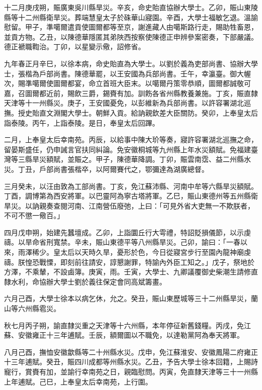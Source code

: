 \begin{pinyinscope}
十二月庚戌朔，賑廣東吳川縣旱災。辛亥，命史貽直協辦大學士。乙卯，賑山東陵縣等十二州縣衛旱災。葬端慧皇太子於硃華山寢園。辛酉，大學士福敏乞退。溫諭慰留。甲子，準噶爾遣貢使圖爾都等至京，謝進藏人由噶斯路行走，賜助牲畜恩，並貢方物。乙丑，以陳德華隱匿其弟陜西按察使陳德正申辨參案密奏，下部嚴議。德正褫職鞫治。丁卯，以星變示儆，詔修省。

九年春正月辛巳，以徐本病，命史貽直為大學士。以劉於義為吏部尚書、協辦大學士，張楷為戶部尚書。陳德華罷，以王安國為兵部尚書。壬午，幸瀛臺。御大幄次，賜準噶爾使圖爾都宴，命立首班大臣末。以噶爾丹策零恭順，圖爾都誠敬可嘉，召圖爾都近前，賜飲三爵，錫賚有加。訓飭各省州縣教養兼施。丁亥，賑直隸天津等十一州縣災。庚子，王安國憂免，以彭維新為兵部尚書。以許容署湖北巡撫。授史貽直文淵閣大學士。朝鮮入貢。給訥親欽差大臣關防。癸卯，上奉皇太后詣泰陵。丙午，上詣泰陵。是日，奉皇太后回蹕。

二月，上奉皇太后幸南苑。丙辰，以給事中陳大玠等奏，寢許容署湖北巡撫之命，留晏斯盛任，仍申誡言官扶同糾論。免安徽桐城等九州縣上年水災額賦。免福建臺灣等三縣旱災額賦，並賑之。甲子，陳德華降調。丁卯，賑雲南霑、益二州縣水災。丁丑，戶部尚書張楷卒，以阿爾賽代之，鄂彌達為湖廣總督。

三月癸未，以汪由敦為工部尚書。丁亥，免江蘇沛縣、河南中牟等六縣旱災額賦。丁酉，調博第為西安將軍。以巴靈阿為寧古塔將軍。乙巳，賑山東德州等五州縣衛旱災。以訥親奏查閱河南、江南營伍廢弛，上曰：「可見外省大吏無一不欺朕者，不可不懲一儆百。」

四月戊申朔，始建先蠶壇成。乙卯，上詣圜丘行大雩禮，特詔貶損儀節，以示虔禱。以旱命省刑寬禁。辛未，賑山東德平等八州縣旱災。己卯，諭曰：「一春以來，雨澤稀少。皇太后以天時久旱，憂形於色，今日從寢宮步行至園內龍神廟虔禱。朕惶恐戰慄，即刻前往請安，諄懇謝罪，特諭內外臣工知之。」戊子，祭地於方澤，不乘輦，不設鹵簿。庚寅，雨。壬寅，大學士、九卿議覆御史柴潮生請修直隸水利，命協辦大學士劉於義往保定會同高斌籌畫。

六月己酉，大學士徐本以病乞休，允之。癸丑，賑山東歷城等三十二州縣旱災，蘭山等六州縣雹災。

秋七月丙子朔，諭直隸災重之天津等十六州縣，本年停征新舊錢糧。丙戌，免江蘇、安徽雍正十三年逋賦。壬辰，額爾圖以不職免，以達勒黨阿為奉天將軍。

八月己酉，撫恤安徽歙縣等二十州縣水災。戊申，免江蘇淮安、安徽鳳陽二府雍正十三年逋賦。癸丑，賑四川成都等州縣水災。乙丑，予告大學士徐本回籍，上賜詩寵行，賞賚有加，並諭行幸南苑之日，親臨慰問。丙寅，免直隸天津等三十一州縣上年逋賦。己巳，上奉皇太后幸南苑，上行圍。


\end{pinyinscope}
